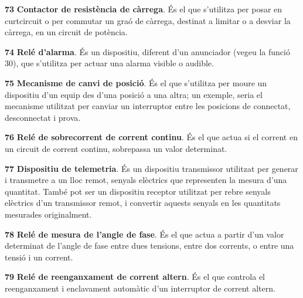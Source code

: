 \begin{multicols}{2}
\begin{list}{}
\item[\textbf{73}]   
\textbf{Contactor de resistència  de càrrega}. És el que s'utilitza per posar en curtcircuit o per commutar un graó de càrrega,
 destinat a limitar o a desviar la càrrega, en un circuit de potència.

\item[\textbf{74}]  
 \textbf{Relé d'alarma}. És un dispositiu,
diferent d'un anunciador (vegeu la funció 30), que s'utilitza per actuar una alarma
visible o audible.

\item[\textbf{75}]  
 \textbf{Mecanisme de canvi de posició}. És el que s'utilitza per moure un dispositiu d'un equip
des d'una posició a una altra; un  exemple, seria el mecanisme
utilitzat per canviar un interruptor entre les posicions de
connectat, desconnectat i prova.

\item[\textbf{76}]   
\textbf{Relé de sobrecorrent de corrent continu}. És el que actua si el corrent en un circuit de
corrent continu, sobrepassa un valor determinat.

\item[\textbf{77}]   
\textbf{Dispositiu de telemetria}. És un
 dispositiu transmissor utilitzat per generar i transmetre  a un lloc remot, senyals elèctrics que representen la mesura d'una quantitat. També pot ser un dispositiu receptor utilitzat per rebre senyals elèctrics d'un transmissor remot, i convertir aquests senyals en les quantitats mesurades originalment.

\item[\textbf{78}]   
\textbf{Relé de  mesura de l'angle de fase}. És el que actua a partir d'un valor determinat de
l'angle de fase entre dues tensions, entre dos corrents, o entre una
tensió i un corrent.

\item[\textbf{79}]   
\textbf{Relé de reenganxament de corrent altern}. És el que controla el reenganxament i enclavament automàtic d'un
interruptor de corrent altern.


\end{list}
\end{multicols}
